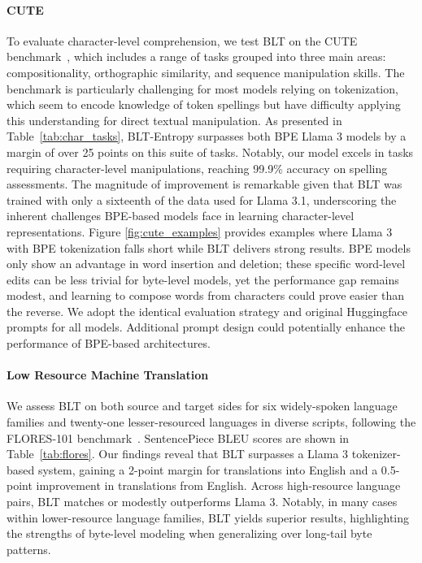 \paragraph{CUTE}
To evaluate character-level comprehension, we test {\textsc BLT} on the CUTE benchmark~\citep{edman2024cute}, which includes a range of tasks grouped into three main areas: compositionality, orthographic similarity, and sequence manipulation skills. The benchmark is particularly challenging for most models relying on tokenization, which seem to encode knowledge of token spellings but have difficulty applying this understanding for direct textual manipulation. As presented in Table~\ref{tab:char_tasks}, {\textsc BLT}-Entropy surpasses both BPE Llama 3 models by a margin of over 25 points on this suite of tasks. Notably, our model excels in tasks requiring character-level manipulations, reaching 99.9\% accuracy on spelling assessments. The magnitude of improvement is remarkable given that {\textsc BLT} was trained with only a sixteenth of the data used for Llama 3.1, underscoring the inherent challenges BPE-based models face in learning character-level representations. Figure \ref{fig:cute_examples} provides examples where Llama 3 with BPE tokenization falls short while {\textsc BLT} delivers strong results. BPE models only show an advantage in word insertion and deletion; these specific word-level edits can be less trivial for byte-level models, yet the performance gap remains modest, and learning to compose words from characters could prove easier than the reverse. We adopt the identical evaluation strategy and original Huggingface prompts for all models. Additional prompt design could potentially enhance the performance of BPE-based architectures.

\paragraph{Low Resource Machine Translation} We assess {\textsc BLT} on both source and target sides for six widely-spoken language families and twenty-one lesser-resourced languages in diverse scripts, following the FLORES-101 benchmark~\citep{goyal2022flores}. SentencePiece BLEU scores are shown in Table~\ref{tab:flores}. Our findings reveal that {\textsc BLT} surpasses a Llama 3 tokenizer-based system, gaining a 2-point margin for translations into English and a 0.5-point improvement in translations from English. Across high-resource language pairs, {\textsc BLT} matches or modestly outperforms Llama 3. Notably, in many cases within lower-resource language families, {\textsc BLT} yields superior results, highlighting the strengths of byte-level modeling when generalizing over long-tail byte patterns.

